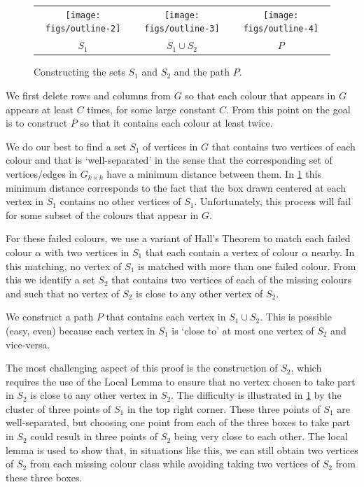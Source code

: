 \documentclass{patmorin}
\begin{document}
\begin{figure}
  \begin{center}
    \begin{tabular}{ccc}
      \texttt{[image: figs/outline-2]} &
      \texttt{[image: figs/outline-3]} &
      \texttt{[image: figs/outline-4]} \\
      $S_1$ & $S_1\cup S_2$ & $P$
    \end{tabular}
  \end{center}
  \caption{Constructing the sets $S_1$ and $S_2$ and the path $P$.}
  \label{outline}
\end{figure}
\begin{compactenum}

  \item We first delete rows and columns from $G$ so that each colour that appears in $G$ appears at least $C$ times, for some large constant $C$.  From this point on the goal is to construct $P$ so that it contains each colour at least twice.

  \item We do our best to find a set $S_1$ of vertices in $G$ that contains two vertices of each colour and that is `well-separated' in the sense that the corresponding set of vertices/edges in $G_{k\times k}$ have a minimum distance between them.  In \cref{outline} this minimum distance corresponds to the fact that the box drawn centered at each vertex in $S_1$ contains no other vertices of $S_1$.
  Unfortunately, this process will fail for some subset of the colours that appear in $G$.

  \item For these failed colours, we use a variant of Hall's Theorem to match each failed colour $\alpha$ with two vertices in $S_1$ that each contain a vertex of colour $\alpha$ nearby.  In this matching, no vertex of $S_1$ is matched with more than one failed colour.  From this we identify a set $S_2$ that contains two vertices of each of the missing colours and such that no vertex of $S_2$ is close to any other vertex of $S_2$.

  \item We construct a path $P$ that contains each vertex in $S_1\cup S_2$.  This is possible (easy, even) because each vertex in $S_1$ is `close to' at most one vertex of $S_2$ and vice-versa.
\end{compactenum}

The most challenging aspect of this proof is the construction of $S_2$, which requires the use of the Local Lemma to ensure that no vertex chosen to take part in $S_2$ is close to any other vertex in $S_2$.  The difficulty is illustrated in \cref{outline} by the cluster of three points of $S_1$ in the top right corner.  These three points of $S_1$ are well-separated, but choosing one point from each of the three boxes to take part in $S_2$ could result in three points of $S_2$ being very close to each other.  The local lemma is used to show that, in situations like this, we can still obtain two vertices of $S_2$ from each missing colour class while avoiding taking two vertices of $S_2$ from these three boxes.
\end{document}
